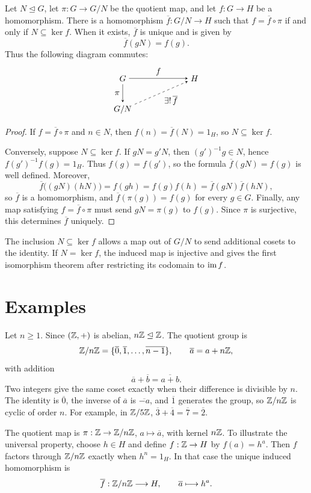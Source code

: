\documentclass[reqno,11pt]{amsart}
\begin{document}
\begin{theorem}\label{thm:universal-quotient}
Let $N\trianglelefteq G$, let $\pi:G\to G/N$ be the quotient map,
and let $f:G\to H$ be a homomorphism. There is a homomorphism
$\overline f:G/N\to H$ such that $f=\overline f\circ\pi$ if and
only if $N\subseteq\ker f$. When it exists, $\overline f$ is unique
and is given by
\[
  \overline f(gN)=f(g).
\]
Thus the following diagram commutes:
\[
\begin{tikzpicture}[baseline=(current bounding box.center),>=stealth]
  \node (G) at (0,1.3) {$G$};
  \node (Q) at (0,0) {$G/N$};
  \node (H) at (3,1.3) {$H$};
  \draw[->] (G)--node[above] {$f$} (H);
  \draw[->] (G)--node[left] {$\pi$} (Q);
  \draw[->,dashed] (Q)--node[below right] {$\exists!\,\overline f$} (H);
\end{tikzpicture}
\]
\end{theorem}
\begin{proof}
If $f=\overline f\circ\pi$ and $n\in N$, then
$f(n)=\overline f(N)=1_H$, so $N\subseteq\ker f$.

Conversely, suppose $N\subseteq\ker f$. If $gN=g'N$, then
$(g')^{-1}g\in N$, hence $f(g')^{-1}f(g)=1_H$.
Thus $f(g)=f(g')$, so the formula
$\overline f(gN)=f(g)$ is well defined. Moreover,
\[
  \overline f\bigl((gN)(hN)\bigr)
  =f(gh)=f(g)f(h)=\overline f(gN)\overline f(hN),
\]
so $\overline f$ is a homomorphism, and
$\overline f(\pi(g))=f(g)$ for every $g\in G$.
Finally, any map satisfying $f=\overline f\circ\pi$ must send
$gN=\pi(g)$ to $f(g)$. Since $\pi$ is surjective, this determines
$\overline f$ uniquely.
\end{proof}

The inclusion $N\subseteq\ker f$ allows a map out of $G/N$
to send additional cosets to the identity. If $N=\ker f$, the
induced map is injective and gives
the first isomorphism theorem after restricting its codomain
to $\operatorname{im} f$.

\section{Examples}

\begin{example}\label{ex:integers-mod-n}
Let $n\geq1$. Since $(\mathbb{Z},+)$ is abelian, $n\mathbb{Z}\trianglelefteq\mathbb{Z}$.
The quotient group is
\[
  \mathbb{Z}/n\mathbb{Z}=\{\overline0,\overline1,\ldots,\overline{n-1}\},
  \qquad \overline a=a+n\mathbb{Z},
\]
with addition
\[
  \overline a+\overline b=\overline{a+b}.
\]
Two integers give the same coset exactly when their difference
is divisible by $n$. The identity is $\overline0$, the inverse
of $\overline a$ is $\overline{-a}$, and $\overline1$ generates
the group, so $\mathbb{Z}/n\mathbb{Z}$ is cyclic of order $n$.
For example, in $\mathbb{Z}/5\mathbb{Z}$,
$\overline3+\overline4=\overline7=\overline2$.

The quotient map is $\pi:\mathbb{Z}\to\mathbb{Z}/n\mathbb{Z}$, $a\mapsto\overline a$,
with kernel $n\mathbb{Z}$. To illustrate the universal property, choose
$h\in H$ and define $f:\mathbb{Z}\to H$ by $f(a)=h^a$.
Then $f$ factors through $\mathbb{Z}/n\mathbb{Z}$ exactly when $h^n=1_H$.
In that case the unique induced homomorphism is
\[
  \overline f:\mathbb{Z}/n\mathbb{Z}\longrightarrow H,
  \qquad \overline a\longmapsto h^a.
\]
\end{example}
\end{document}
